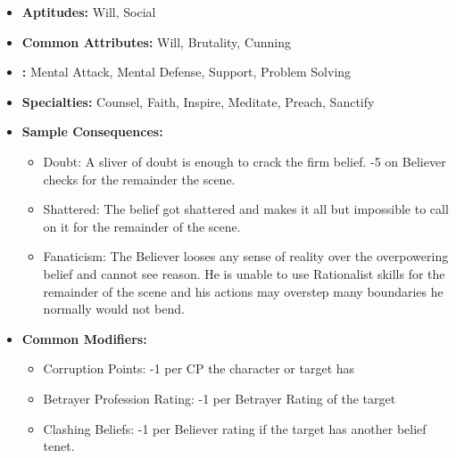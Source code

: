 		\begin{itemize}
			\item \textbf{Aptitudes:} Will, Social
			\item \textbf{Common Attributes:} Will, Brutality, Cunning
			\item \textbf{:} Mental Attack, Mental Defense, Support, Problem Solving
			\item \textbf{Specialties:} Counsel, Faith, Inspire, Meditate, Preach, Sanctify
			\item \textbf{Sample Consequences:} 
			\begin{itemize}
				\item Doubt: A sliver of doubt is enough to crack the firm belief. -5 on Believer checks for the remainder the scene.
				\item Shattered: The belief got shattered and makes it all but impossible to call on it for the remainder of the scene.
				\item Fanaticism: The Believer looses any sense of reality over the overpowering belief and cannot see reason. He is unable to use Rationalist skills for the remainder of the scene and his actions may overstep many boundaries he normally would not bend.
			\end{itemize}
			\item \textbf{Common Modifiers:}
			\begin{itemize}
				\item Corruption Points: -1 per CP the character or target has
				\item Betrayer Profession Rating: -1 per Betrayer Rating of the target
				\item Clashing Beliefs: -1 per Believer rating if the target has another belief tenet.
			\end{itemize}
		\end{itemize}

